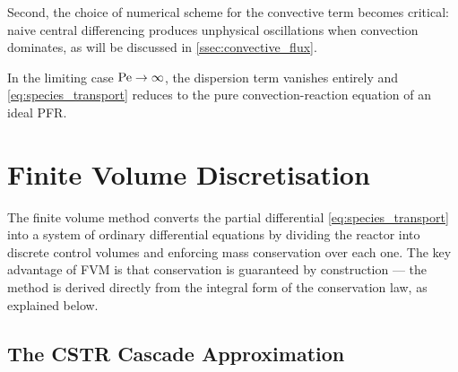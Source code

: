 Second, the choice of numerical scheme for the convective term becomes critical: naive central differencing produces unphysical oscillations when convection dominates, as will be discussed in \cref{ssec:convective_flux}.

In the limiting case \(\mathrm{Pe} \to \infty\), the dispersion term vanishes entirely and \cref{eq:species_transport} reduces to the pure convection-reaction equation of an ideal PFR\@.

\section{Finite Volume Discretisation}\label{sec:fvm}

The finite volume method converts the partial differential \cref{eq:species_transport} into a system of ordinary differential equations by dividing the reactor into discrete control volumes and enforcing mass conservation over each one. The key advantage of FVM is that conservation is guaranteed by construction --- the method is derived directly from the integral form of the conservation law, as explained below.

\subsection{The CSTR Cascade Approximation}\label{ssec:cstr_cascade}


